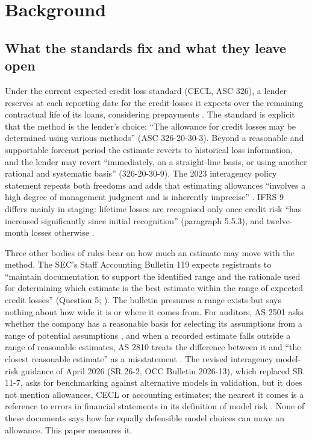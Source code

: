 \section{Background}\label{sec:background}

\subsection{What the standards fix and what they leave open}

Under the current expected credit loss standard (CECL, ASC 326), a lender
reserves at each reporting date for the credit losses it expects over the
remaining contractual life of its loans, considering prepayments
\citep{asc326}. The standard is explicit that the method is the lender's
choice: ``The allowance for credit losses may be determined using various
methods'' (ASC 326-20-30-3). Beyond a reasonable and supportable forecast
period the estimate reverts to historical loss information, and the lender may
revert ``immediately, on a straight-line basis, or using another rational and
systematic basis'' (326-20-30-9). The 2023 interagency policy statement
repeats both freedoms and adds that estimating allowances ``involves a high
degree of management judgment and is inherently imprecise''
\citep{ips2023acl}. IFRS 9 differs mainly in staging: lifetime losses are
recognised only once credit risk ``has increased significantly since initial
recognition'' (paragraph 5.5.3), and twelve-month losses otherwise
\citep{ifrs9}.

Three other bodies of rules bear on how much an estimate may move with the
method. The SEC's Staff Accounting Bulletin 119 expects registrants to
``maintain documentation to support the identified range and the rationale
used for determining which estimate is the best estimate within the range of
expected credit losses'' (Question 5; \citealp{sab119}). The bulletin presumes a range exists
but says nothing about how wide it is or where it comes from. For auditors,
AS 2501 asks whether the company has a reasonable basis for selecting its
assumptions from a range of potential assumptions \citep{pcaob2501}, and when
a recorded estimate falls outside a range of reasonable estimates, AS 2810
treats the difference between it and ``the closest reasonable estimate'' as a
misstatement \citep{pcaob2810}. The revised interagency model-risk
guidance of April 2026 (SR 26-2, OCC Bulletin 2026-13), which replaced SR 11-7,
asks for benchmarking against alternative models in validation, but it does
not mention allowances, CECL or accounting estimates; the nearest it comes is a
reference to errors in financial statements in its definition of model risk
\citep{sr262, SR117}. None of these documents says how far equally defensible
model choices can move an allowance. This paper measures it.

